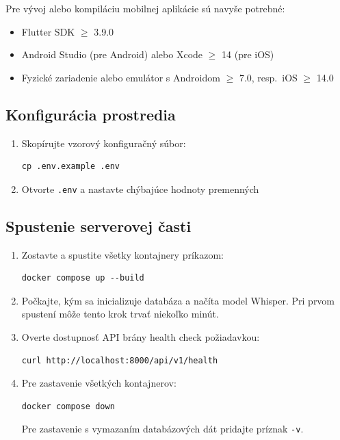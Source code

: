 Pre vývoj alebo kompiláciu mobilnej aplikácie sú navyše potrebné:

\begin{itemize}
    \item Flutter SDK $\geq$ 3.9.0
    \item Android Studio (pre Android) alebo Xcode $\geq$ 14 (pre iOS)
    \item Fyzické zariadenie alebo emulátor s Androidom $\geq$ 7.0, resp.\ iOS $\geq$ 14.0
\end{itemize}

\subsection{Konfigurácia prostredia}

\begin{enumerate}
    \item Skopírujte vzorový konfiguračný súbor:
    \begin{verbatim}
cp .env.example .env
    \end{verbatim}
    \item Otvorte \texttt{.env} a nastavte chýbajúce hodnoty premenných
\end{enumerate}

\subsection{Spustenie serverovej časti}

\begin{enumerate}
    \item Zostavte a spustite všetky kontajnery príkazom:
    \begin{verbatim}
docker compose up --build
    \end{verbatim}
    \item Počkajte, kým sa inicializuje databáza a načíta model Whisper. Pri prvom spustení môže tento krok trvať niekoľko minút.
    \item Overte dostupnosť API brány health check požiadavkou:
    \begin{verbatim}
curl http://localhost:8000/api/v1/health
    \end{verbatim}
    \item Pre zastavenie všetkých kontajnerov:
    \begin{verbatim}
docker compose down
    \end{verbatim}
    Pre zastavenie s vymazaním databázových dát pridajte príznak \texttt{-v}.
\end{enumerate}

